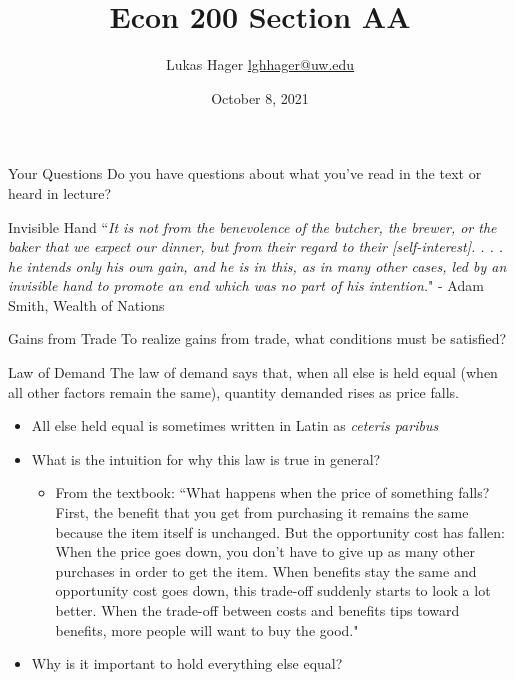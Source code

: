 \documentclass{beamer}
\title{Econ 200 Section AA}
\author{Lukas Hager \newline \href{mailto:lghhager@uw.edu}{lghhager@uw.edu}}
\institute{Office Hours: Wednesday 3-4, Friday 10-11}
\date{October 8, 2021}
\begin{document}
\begin{frame}
  \titlepage
\end{frame}


\begin{frame}{Your Questions}
    Do you have questions about what you've read in the text or heard in lecture?
\end{frame}

\begin{frame}{Invisible Hand}
    ``\textit{It is not from the benevolence of the butcher, the brewer, or the baker that we expect our dinner, but from their regard to their [self-interest]. . . . he intends only his own gain, and he is in this, as in many other cases, led by an invisible hand to promote an end which was no part of his intention.}" - Adam Smith, Wealth of Nations
\end{frame}

\begin{frame}[t]{Gains from Trade}
    To realize gains from trade, what conditions must be satisfied?
\end{frame}

\begin{frame}[t]{Law of Demand}
   The law of demand says that, when all else is held equal (when all other factors remain the same), quantity demanded rises as price falls.
    \begin{itemize}
        \item All else held equal is sometimes written in Latin as \textit{ceteris paribus}
        \item What is the intuition for why this law is true in general?
        \begin{itemize}
            \item From the textbook: ``What happens when the price of something falls? First, the benefit that you get from purchasing it remains the same because the item itself is unchanged. But the opportunity cost has fallen: When the price goes down, you don’t have to give up as many other purchases in order to get the item. When benefits stay the same and opportunity cost goes down, this trade-off suddenly starts to look a lot better. When the trade-off between costs and benefits tips toward benefits, more people will want to buy the good."
        \end{itemize}
        \item Why is it important to hold everything else equal?
    \end{itemize}
\end{frame}
\end{document}
